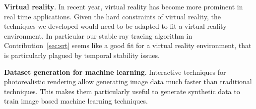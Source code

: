 \textbf{Virtual reality}. In recent year, virtual reality has become more prominent in real time applications. Given the hard constraints of virtual reality, the techniques we developed would need to be adapted to fit a virtual reality environment. In particular our stable ray tracing algorithm in Contribution~\ref{sec:srt} seems like a good fit for a virtual reality environment, that is particularly plagued by temporal stability issues. 

\textbf{Dataset generation for machine learning}. Interactive techniques for photorealistic rendering allow generating image data much faster than traditional techniques. This makes them particularly useful to generate synthetic data to train image based machine learning techniques.  